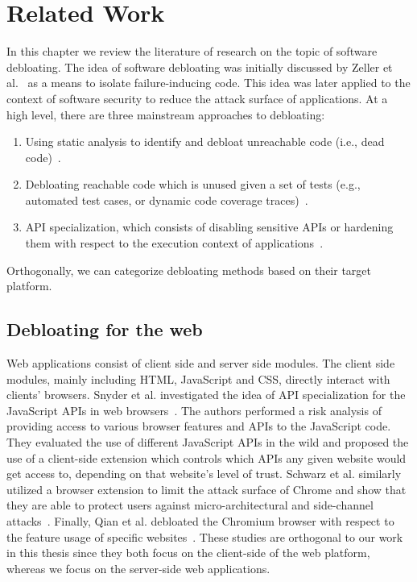 \chapter{Related Work}
\label{chap:relatedwork}

In this chapter we review the literature of research on the topic of software debloating. 
The idea of software debloating was initially discussed by Zeller et al.~\cite{zeller2002simplifying} as a means to isolate failure-inducing code. 
This idea was later applied to the context of software security to reduce the attack surface of applications. 
At a high level, there are three mainstream approaches to debloating: 

\begin{enumerate}
    \item Using static analysis to identify and debloat unreachable code (i.e., dead code)~\cite{redini2019b, snyder2017most, quach2018debloating, mininode, 255308}.
    \item Debloating reachable code which is unused given a set of tests (e.g., automated test cases, or dynamic code coverage traces)~\cite{lessismore, heo2018effective,qian2020slimium, koo2019configuration}.
    \item API specialization, which consists of disabling sensitive APIs or hardening them with respect to the execution context of applications~\cite{mishra2020saffire, saphire, jahanshahi2020you, mishra2021sgxpecial}. 
\end{enumerate}

Orthogonally, we can categorize debloating methods based on their target platform. 

\section{Debloating for the web}

Web applications consist of client side and server side modules. 
The client side modules, mainly including HTML, JavaScript and CSS, directly interact with clients' browsers. 
Snyder et al. investigated the idea of API specialization for the JavaScript APIs in web browsers~\cite{snyder2017vibrate}. 
The authors performed a risk analysis of providing access to various browser features and APIs to the JavaScript code.
They evaluated the use of different
JavaScript APIs in the wild and proposed the use of a client-side extension
which controls which APIs any given website would get access to, depending
on that website's level of trust. 
Schwarz et al. similarly utilized a browser
extension to limit the attack surface of Chrome and show that they are able
to protect users against micro-architectural and side-channel
attacks~\cite{Schwarz2018}. 
Finally, Qian et al. debloated the Chromium browser with respect to the feature usage of specific websites~\cite{qian2020slimium}. 
These studies are orthogonal to our work in this thesis since
they both focus on the client-side of the web platform, whereas we focus on
the server-side web applications.

